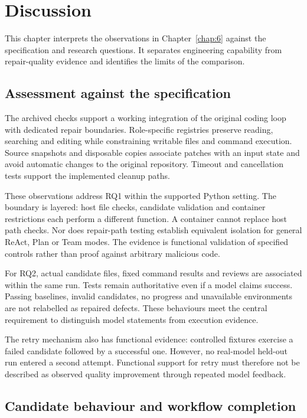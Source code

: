 \chapter{Discussion}\label{chap:7}

This chapter interprets the observations in Chapter~\ref{chap:6} against the specification and research questions. It separates engineering capability from repair-quality evidence and identifies the limits of the comparison.

\section{Assessment against the specification}\label{sec:7.1}

The archived checks support a working integration of the original coding loop with dedicated repair boundaries. Role-specific registries preserve reading, searching and editing while constraining writable files and command execution. Source snapshots and disposable copies associate patches with an input state and avoid automatic changes to the original repository. Timeout and cancellation tests support the implemented cleanup paths.

These observations address RQ1 within the supported Python setting. The boundary is layered: host file checks, candidate validation and container restrictions each perform a different function. A container cannot replace host path checks. Nor does repair-path testing establish equivalent isolation for general ReAct, Plan or Team modes. The evidence is functional validation of specified controls rather than proof against arbitrary malicious code.

For RQ2, actual candidate files, fixed command results and reviews are associated within the same run. Tests remain authoritative even if a model claims success. Passing baselines, invalid candidates, no progress and unavailable environments are not relabelled as repaired defects. These behaviours meet the central requirement to distinguish model statements from execution evidence.

The retry mechanism also has functional evidence: controlled fixtures exercise a failed candidate followed by a successful one. However, no real-model held-out run entered a second attempt. Functional support for retry must therefore not be described as observed quality improvement through repeated model feedback.

\section{Candidate behaviour and workflow completion}\label{sec:7.2}


